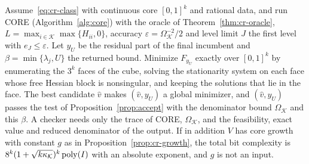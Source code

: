 \begin{theorem}\label{thm:cr-exact}
Assume~\eqref{eq:cr-class} with continuous core $[0,1]^k$ and rational data,
and run CORE (Algorithm~\ref{alg:core}) with the oracle of
Theorem~\ref{thm:cr-oracle}, $L=\max_{i\in\mathcal K}\max\{H_{ii},0\}$,
accuracy $\varepsilon=\Omega_{\mathcal K}^{-2}/2$ and level limit $J$ the
first level with $e_J\le\varepsilon$. Let $y_U$ be the residual part of the
final incumbent and $\beta=\min\{\lambda_j,U\}$ the returned bound.
Minimize $F_{y_U}$ exactly over $[0,1]^k$ by enumerating the $3^k$ faces of
the cube, solving the stationarity system on each face whose free Hessian
block is nonsingular, and keeping the solutions that lie in the face. The best candidate $\hat v$ makes $(\hat v,y_U)$ a global
minimizer, and $(\hat v,y_U)$ passes the test of
Proposition~\ref{prop:accept} with the denominator bound
$\Omega_{\mathcal K}$ and this $\beta$. A checker needs only
the trace of CORE, $\Omega_{\mathcal K}$, and the feasibility, exact value
and reduced denominator of the output. If in addition $V$ has core growth
with constant $g$ as in Proposition~\ref{prop:cr-growth}, the total bit
complexity is $8^k(1+\sqrt{k\kappa_{\mathcal K}})^k\operatorname{poly}(I)$ with an
absolute exponent, and $g$ is not an input.
\end{theorem}

